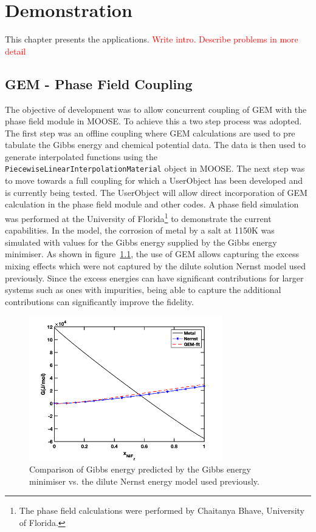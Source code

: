 \chapter{Demonstration} \label{chap:results}


	This chapter presents the applications. {\textcolor{red}{Write intro. Describe problems in more detail}}
	
	\section{GEM - Phase Field Coupling}
The objective of {\YJ} development was to allow concurrent coupling of GEM with the phase field module in MOOSE. To achieve this a two step process was adopted. The first step was an offline coupling where GEM calculations are used to pre tabulate the Gibbs energy and chemical potential data. The data is then used to generate interpolated functions using the \texttt{PiecewiseLinearInterpolationMaterial} object in MOOSE. The next step was to move towards a full coupling for which a UserObject has been developed and is currently being tested. The UserObject will allow direct incorporation of GEM calculation in the phase field module and other codes. A phase field simulation was performed at the University of Florida\footnote{The phase field calculations were performed by Chaitanya Bhave, University of Florida.} to demonstrate the current capabilities. In the model, the corrosion of  metal by a  salt at 1150\si{\kelvin} was simulated with values for the Gibbs energy supplied by the Gibbs energy minimiser. As shown in figure~\ref{fig:pfgibbs}, the use of GEM allows capturing the excess mixing effects which were not captured by the dilute solution Nernst model used previously. Since the excess energies can have significant contributions for larger systems such as ones with impurities, being able to capture the additional contributions can significantly improve the fidelity.
    \begin{figure}[h!]
        \centering
        \includegraphics[width=0.75\textwidth]{figures/chapter-7/gibbs.png}
        \caption{Comparison of Gibbs energy predicted by the Gibbs energy minimiser vs. the dilute Nernst energy model used previously.}
        \label{fig:pfgibbs}
    \end{figure}

